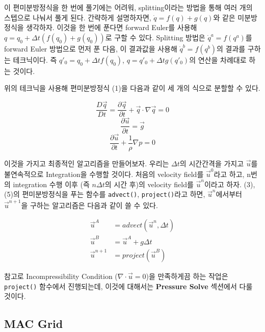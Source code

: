 \documentclass[11pt, A4]{article}
\begin{document}
이 편미분방정식을 한 번에 풀기에는 어려워, splitting이라는 방법을 통해 여러 개의 스텝으로 나눠서 풀게 된다.
간략하게 설명하자면, $\dot q = f(q) + g(q)$와 같은 미분방정식을 생각하자.
이것을 한 번에 푼다면 forward Euler를 사용해 $q = q_0 + \Delta t (f(q_0) + g(q_0))$로 구할 수 있다.
Splitting 방법은 $\dot q^a = f(q^a)$를 forward Euler 방법으로 먼저 푼 다음, 이 결과값을 사용해 $\dot q^b = f(q^b)$의 결과를 구하는 테크닉이다. 즉 $q'_0 = q_0 + \Delta t f(q_0)$, $q = q'_0 + \Delta t g(q'_0)$의 연산을 차례대로 하는 것이다. \cite[p.17-19]{fluid-sim-cg}

위의 테크닉을 사용해 편미분방정식 (1)을 다음과 같이 세 개의 식으로 분할할 수 있다.

\begin{equation}
  \frac{D\vec{q}}{Dt} = \frac{\partial \vec{q}}{\partial t} + \vec{q} \cdot \nabla \vec{q} = 0
\end{equation}
\begin{equation}
  \frac{\partial \vec{u}}{\partial t} = \vec{g}
\end{equation}
\begin{equation}
  \frac{\partial \vec{u}}{\partial t} + \frac{1}{\rho} \nabla p = 0
\end{equation}

이것을 가지고 최종적인 알고리즘을 만들어보자.
우리는 $\Delta t$의 시간간격을 가지고 $\vec{u}$를 불연속적으로 Integration을 수행할 것이다. 처음의 velocity field를 $\vec{u}^0$라고 하고, n번의 integration 수행 이후 (즉 $n \Delta t$의 시간 후)의 velocity field를 $\vec{u}^n$이라고 하자. (3), (5)의 편미분방정식을 푸는 함수를 \texttt{advect()}, \texttt{project()}라고 하면, $\vec{u}^n$에서부터 $\vec{u}^{n+1}$을 구하는 알고리즘은 다음과 같이 쓸 수 있다. \cite[p.20]{fluid-sim-cg}

\begin{align}
  \vec{u}^A &= advect(\vec{u}^n, \Delta t) \\
  \vec{u}^B &= \vec{u}^A + g \Delta t \\
  \vec{u}^{n+1} &= project(\vec{u}^B)
\end{align}

참고로 Incompressibility Condition ($\nabla \cdot \vec{u} = 0$)을 만족하게끔 하는 작업은 \texttt{project()} 함수에서 진행되는데, 이것에 대해서는 \textbf{Pressure Solve} 섹션에서 다룰 것이다.

\subsection{MAC Grid}
\end{document}
